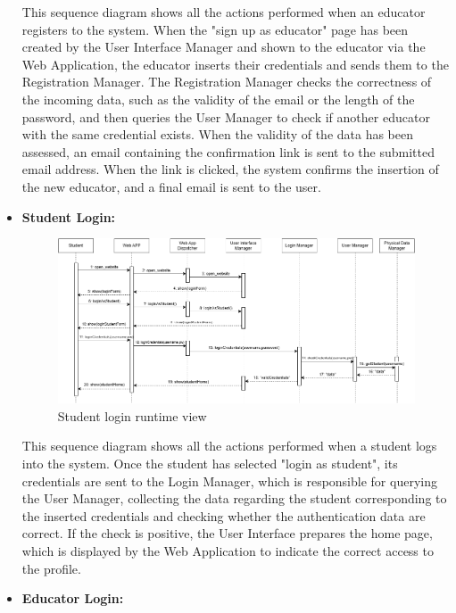 \begin{itemize}
    This sequence diagram shows all the actions performed when an educator registers to the system. When the "sign up as educator" page has been created by the User Interface Manager and shown to the educator via the Web Application, the educator inserts their credentials and sends them to the Registration Manager. The Registration Manager checks the correctness of the incoming data, such as the validity of the email or the length of the password, and then queries the User Manager to check if another educator with the same credential exists. When the validity of the data has been assessed, an email containing the confirmation link is sent to the submitted email address. When the link is clicked, the system confirms the insertion of the new educator, and a final email is sent to the user.

    \newpage
    
    \item \textbf{Student Login:}

    \begin{figure}[H]
        \centering
        \includegraphics[width=1\linewidth]{Images/RV3.png}
        \caption{Student login runtime view}
        \label{fig:rv3}
    \end{figure}

    This sequence diagram shows all the actions performed when a student logs into the system. Once the student has selected "login as student", its credentials are sent to the Login Manager, which is responsible for querying the User Manager, collecting the data regarding the student corresponding to the inserted credentials and checking whether the authentication data are correct. If the check is positive, the User Interface prepares the home page, which is displayed by the Web Application to indicate the correct access to the profile.

    \newpage

    \item \textbf{Educator Login:}


\end{itemize}
